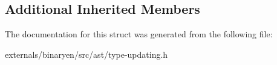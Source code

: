 \subsection*{Additional Inherited Members}


The documentation for this struct was generated from the following file\+:\begin{DoxyCompactItemize}
\item 
externals/binaryen/src/ast/type-\/updating.\+h\end{DoxyCompactItemize}
